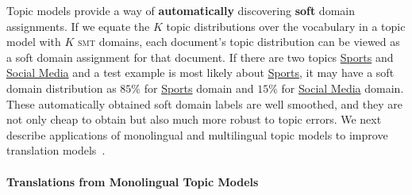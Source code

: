 Topic models provide a way of \textbf{automatically} discovering \textbf{soft} domain assignments. 
If we equate the $K$ topic distributions over the vocabulary in a topic model with $K$ 
\textsc{smt} domains, each document's topic distribution can be viewed as a soft
domain assignment for that document.
If there are two topics \underline{Sports} and \underline{Social Media} and
a test example is most likely about \underline{Sports}, it may
have a soft domain distribution as $85\%$ for \underline{Sports}
domain and $15\%$ for \underline{Social Media} domain. These automatically
obtained soft domain labels are well smoothed, and they are not only
cheap to obtain but also much more robust to topic errors. 
We next describe applications of monolingual and multilingual
topic models to improve translation models~\citep{Eidelman-12,hu-14}.




\paragraph{Translations from Monolingual Topic Models}

